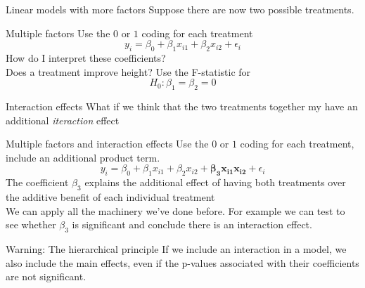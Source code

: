 \documentclass{bredelebeamer}
\begin{document}
\begin{frame}{Linear models with more factors}
Suppose there are now two possible treatments.
\begin{exampleblock}{Multiple factors}
	Use the $0$ or $1$ coding for each treatment
	\begin{equation}
	y_i = \beta_0 + \beta_1x_{i1} + \beta_2x_{i2} + \epsilon_i
\end{equation}
How do I interpret these coefficients?
\\
Does a treatment improve height? Use the F-statistic for 
\begin{equation}
H_0: \beta_1 = \beta_2 = 0 
\end{equation}
\end{exampleblock}
\end{frame}
\begin{frame}{Interaction effects}
What if we think that the two treatments together my have an additional \textit{iteraction} effect
\begin{exampleblock}{Multiple factors and interaction effects}
	Use the $0$ or $1$ coding for each treatment, include an additional product term.
	\begin{equation}
	y_i = \beta_0 + \beta_1x_{i1} + \beta_2x_{i2} + \boldsymbol{\beta_3x_{i1}x_{i2}} + \epsilon_i
	\end{equation}
	The coefficient $\beta_3$ explains the additional effect of having both treatments over the additive benefit of each individual treatment
	\\
	We can apply all the machinery we've done before. For example we can test to see whether $\beta_3$ is significant and conclude there is an interaction effect.
\end{exampleblock}
\begin{alertblock}{Warning: The hierarchical principle}
	If we include an interaction in a model, we also include the main effects, even if the p-values associated with their coefficients are not significant.
\end{alertblock}

\end{frame}
\end{document}
